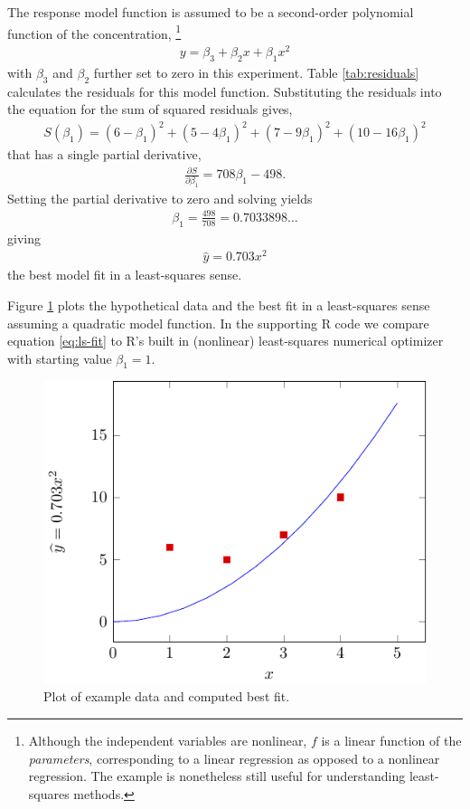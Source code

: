 The response model function is assumed to be a second-order polynomial
function of the concentration,%
\footnote{Although the independent variables are nonlinear, 
\(f\) is a linear function of the \emph{parameters}, 
corresponding to a linear regression as opposed to a nonlinear regression. 
The example is nonetheless still useful for understanding least-squares methods.}
\begin{align}
y = \beta_{3} + \beta_{2}x + \beta_{1}x^{2}
\end{align}
with \(\beta_{3}\) and \(\beta_{2}\) further set to zero in this
experiment. Table \ref{tab:residuals} calculates the residuals for this model function.
Substituting the residuals into the equation for the sum of squared
residuals gives,
\begin{align}
S\left( \beta_{1} \right) = \left( 6 - \beta_{1} \right)^{2} + \left( 5 - 4\beta_{1} \right)^{2} + \left( 7 - 9\beta_{1} \right)^{2} + \left( 10 - 16\beta_{1} \right)^{2}
\end{align}
that has a single partial derivative,
\begin{align}
\frac{\partial S}{\partial\beta_{1}} = 708\beta_{1} - 498.
\end{align}
Setting the partial derivative to zero and solving yields
\begin{align}
\beta_{1} = \frac{498}{708} = 0.7033898\ldots
\end{align}
giving
\begin{align}\label{eq:ls-fit}
\widehat{y} = 0.703x^{2}
\end{align}
the best model fit in a least-squares sense.

Figure \ref{fig:ls-fit} plots the hypothetical data and the best fit in a least-squares 
sense assuming a quadratic model function. 
In the supporting R code we compare equation \ref{eq:ls-fit} to R's built in (nonlinear) least-squares
numerical optimizer with starting value \(\beta_{1} = 1\).

\begin{figure}[h!]
\centering
\includegraphics[width=0.5\linewidth]{tikz/figure1}
\caption{%
Plot of example data and computed best fit.
}
\label{fig:ls-fit}
\end{figure}

